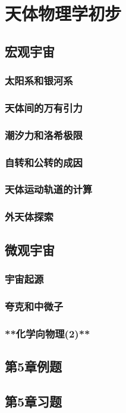 \chapter{天体物理学初步}
\section{宏观宇宙}
\subsection{太阳系和银河系}
\subsection{天体间的万有引力}
\subsection{潮汐力和洛希极限}
\subsection{自转和公转的成因}
\subsection{天体运动轨道的计算}
\subsection{外天体探索}
\section{微观宇宙}
\subsection{宇宙起源}
\subsection{夸克和中微子}
\subsection{**化学向物理(2)**}
\section{第5章例题}
\section{第5章习题}